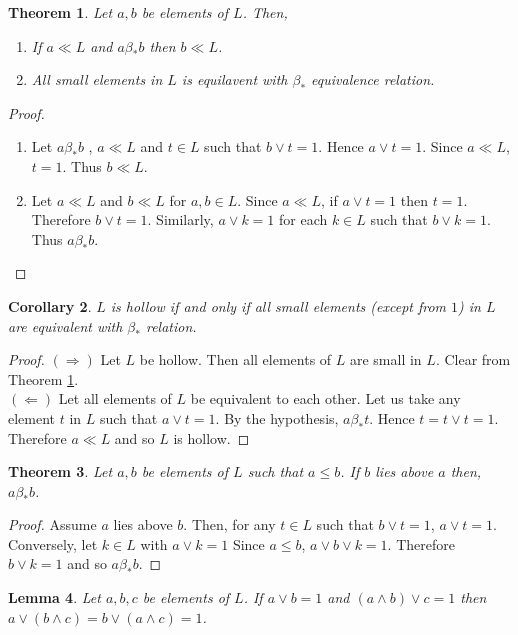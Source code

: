 \documentclass[a4paper,12pt]{article}
\newtheorem{theorem}{Theorem}[section]
\newtheorem{lemma}[theorem]{Lemma}
\newtheorem{corollary}[theorem]{Corollary}
\numberwithin{equation}{section}
\begin{document}
\begin{theorem} \label{4}
  Let $ a,b $ be elements of $ L $. Then,
  \begin{enumerate}
    \item
      If $ a \ll L $ and $ a \beta_* b $ then $ b \ll L $.
    \item
      All small elements in $ L $ is equilavent with $ \beta_* $ equivalence relation.
  \end{enumerate}
\end{theorem}

\begin{proof}
  \begin{enumerate}
    \item
      Let $ a \beta_* b $ , $ a \ll L $ and $ t \in L $ such that $ b \vee t = 1 $. 
      Hence $ a \vee t = 1 $. Since $ a \ll L $, $ t = 1 $. Thus $ b \ll L $. 
    \item
      Let $ a \ll L $ and $ b \ll L $ for $ a,b \in L $. Since $ a \ll L $, if $ a \vee t = 1 $ 
      then $ t = 1 $. Therefore $ b \vee t = 1 $. 
      Similarly, $ a \vee k = 1 $ for each $ k \in L $ such that $ b \vee k = 1 $. 
      Thus $ a \beta_* b $. 
  \end{enumerate}
\end{proof}

\begin{corollary} \label{5}
  $ L $ is hollow if and only if all small elements (except from $ 1 $) in $ L $ are equivalent with $ \beta_* $ relation. 
\end{corollary}
\begin{proof}
  $ ( \Rightarrow ) $
  Let $ L $ be hollow. Then all elements of $ L $ are small in $ L $. Clear from Theorem \ref{4}. \\
  $ ( \Leftarrow ) $ 
  Let all elements of $ L $ be equivalent to each other. Let us take any element $ t $ in $ L $ 
  such that $ a \vee t = 1 $. By the hypothesis, $ a \beta_* t $. Hence $ t = t \vee t = 1 $. 
  Therefore $ a \ll L $ and so $ L $ is hollow. 
\end{proof}
\begin{theorem}\label{6}
  Let $ a,b $ be elements of $ L $ such that $ a \leq b $. 
  If $ b $ lies above $ a $ then, $ a \beta_* b $. 
\end{theorem}
\begin{proof}
  Assume $ a $ lies above $ b $. Then, for any $ t \in L $ such that $ b \vee t = 1 $, 
  $ a \vee t = 1 $. Conversely, let $ k \in L $ with $ a \vee k = 1 $  
  Since $ a \leq b $, $ a \vee b \vee k = 1 $. Therefore $ b \vee k = 1 $ and so $ a \beta_* b $.

\end{proof}
\begin{lemma}\label{7}
  Let $ a,b,c $ be elements of $ L $.
  If $ a \vee b = 1 $ and $ ( a \wedge b ) \vee c =1 $
  then $ a \vee(b \wedge c)=b \vee ( a \wedge c ) = 1 $.
\end{lemma}
\end{document}
